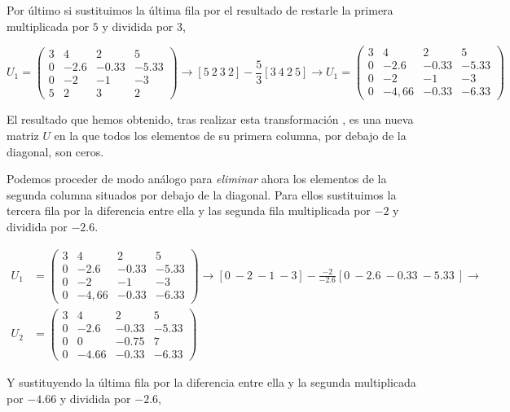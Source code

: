 Por último si sustituimos la última fila por el resultado de restarle la primera multiplicada por $5$ y dividida por $3$,

\begin{equation*}
U_1=\begin{pmatrix}
3& 4& 2&5\\
0& -2.6& -0.33& -5.33\\
0& -2& -1& -3\\
5& 2& 3& 2
\end{pmatrix} \rightarrow [5\ 2\ 3\ 2]-\frac{5}{3} [3\ 4\ 2\ 5] \rightarrow U_1=\begin{pmatrix}
3& 4& 2&5\\
0& -2.6& -0.33& -5.33\\
0& -2& -1& -3\\
0& -4,66& -0.33& -6.33
\end{pmatrix}
\end{equation*}

El resultado que hemos obtenido, tras realizar esta transformación , es una nueva matriz $U$ en la que todos los elementos de su primera columna, por debajo de la diagonal, son ceros.

Podemos proceder de modo análogo para \emph{eliminar} ahora los elementos de la segunda columna situados por debajo de la diagonal. Para ellos sustituimos la tercera fila  por la diferencia entre ella y las segunda fila multiplicada por 	$-2$  y dividida por $-2.6$.

\begin{align*}
U_1 &=\begin{pmatrix}
3& 4& 2&5\\
0& -2.6& -0.33& -5.33\\
0& -2& -1& -3\\
0& -4,66& -0.33& -6.33
\end{pmatrix} \rightarrow [0\ -2\ -1\ -3]-\frac{-2}{-2.6} [0\ -2.6\ -0.33\ -5.33\ ] \rightarrow \\
 U_2 &=\begin{pmatrix}
3& 4& 2&5\\
0& -2.6& -0.33& -5.33\\
0& 0& -0.75& 7\\
0& -4.66& -0.33& -6.33
\end{pmatrix}
\end{align*}

Y sustituyendo la última fila por  la diferencia entre ella y la segunda multiplicada por $-4.66$ y dividida por $-2.6$,

